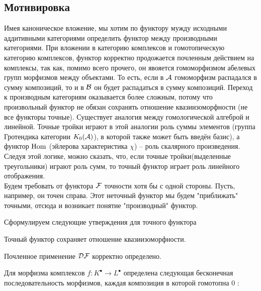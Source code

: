 \documentclass[../main.tex]{subfiles}
\begin{document}
\subsection{Мотивировка}
Имея каноническое вложение, мы хотим по функтору мужду исходными аддитивными категориями определить функтор между производными категориями. При вложении в категорию комплексов и гомотопическую категорию комплексов, функтор корректно
продожается почленным действием на комплексы, так как, помимо всего прочего, он явояется гомоморфизмом абелевых групп морфизмов между объектами. То есть, если в $\mathcal{A}$ гомоморфизм распадался в сумму композиций, то и в $\mathcal{B}$ он будет распадаться в сумму композиций. Переход к производным категориям оказывается более сложным, потому что произвольный функтор не обязан сохранять отношение квазиизоморфности (не все функторы точные). Существует аналогия между гомологической алгеброй и линейной. Точные тройки играют в этой аналогии роль суммы элементов (группа Гротендика категории $K_0(\mathcal{A})$), в которой также может быть введён базис), а функтор $\operatorname{Hom}$ (эйлерова характеристика $\chi$) -- роль скалярного произведения. Следуя этой логике, можно сказать, что, если точные тройки(выделенные треугольники) играют роль сумм, то точный функтор играет роль линейного отображения.\\
Будем требовать от функтора $\mathcal{F}$ точности хотя бы с одной стороны. Пусть, например, он точен справа. Этот неточный функтор мы будем "приближать" точными, отсюда и возникает понятие "производный" функтор.
\bee
\eee
Сформулируем следующие утверждения для точного функтора 
\begin{to_claim}
 Точный функтор сохраняет отношение квазиизоморфности. 
\end{to_claim}
\begin{to_claim}
 Почленное применение $\mathcal{D F}$ корректно определено. 
\end{to_claim}
\begin{to_com}
    Для морфизма комплексов $f\colon K^\bullet\to L^\bullet$ определена следующая бесконечная последовательность морфизмов, каждая композиция в которой гомотопна 0 : 
    \bee {}\eee
\end{to_com}
\end{document}
